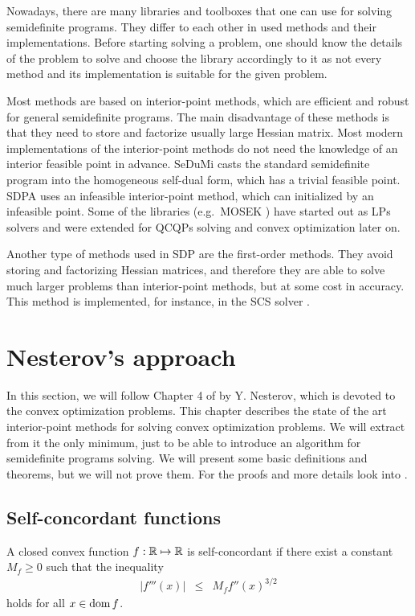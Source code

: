 Nowadays, there are many libraries and toolboxes that one can use for solving semidefinite programs.
They differ to each other in used methods and their implementations.
Before starting solving a problem, one should know the details of the problem to solve and choose the library accordingly to it as not every method and its implementation is suitable for the given problem.

Most methods are based on interior-point methods, which are efficient and robust for general semidefinite programs.
The main disadvantage of these methods is that they need to store and factorize usually large Hessian matrix.
Most modern implementations of the interior-point methods do not need the knowledge of an interior feasible point in advance.
SeDuMi \cite{sedumi} casts the standard semidefinite program into the homogeneous self-dual form, which has a trivial feasible point.
SDPA \cite{sdpa} uses an infeasible interior-point method, which can initialized by an infeasible point.
Some of the libraries (e.g.\ MOSEK \cite{mosek}) have started out as LPs solvers and were extended for QCQPs solving and convex optimization later on.

Another type of methods used in SDP are the first-order methods. 
They avoid storing and factorizing Hessian matrices, and therefore they are able to solve much larger problems than interior-point methods, but at some cost in accuracy.
This method is implemented, for instance, in the SCS solver \cite{scs}.

\section{Nesterov's approach}
In this section, we will follow Chapter 4 of \cite{Nesterov-2004} by Y. Nesterov, which is devoted to the convex optimization problems.
This chapter describes the state of the art interior-point methods for solving convex optimization problems.
We will extract from it the only minimum, just to be able to introduce an algorithm for semidefinite programs solving.
We will present some basic definitions and theorems, but we will not prove them.
For the proofs and more details look into \cite{Nesterov-2004}.

\subsection{Self-concordant functions}
\begin{definition}
  A closed convex function $f: \mathbb{R} \mapsto \mathbb{R}$ is self-concordant if there exist a constant $M_f \geq 0$ such that the inequality
  \begin{eqnarray}
    |f'''(x)| &\leq& M_f f''(x)^{3/2}
  \end{eqnarray}
  holds for all $x\in\operatorname{dom} f$.
\end{definition}

